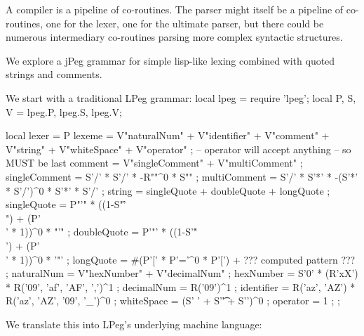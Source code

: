 A compiler is a pipeline of co-routines. The parser might itself be a 
pipeline of co-routines, one for the lexer, one for the ultimate parser, 
but there could be numerous intermediary co-routines parsing more complex 
syntactic structures. 

We explore a jPeg grammar for simple lisp-like lexing combined with quoted 
strings and comments. 

We start with a traditional LPeg grammar:
\starttyping
local lpeg = require 'lpeg';
local P, S, V = lpeg.P, lpeg.S, lpeg.V;

local lexer = P {
  lexeme     = V"naturalNum" +
               V"identifier" +
               V"comment"    +
               V"string"     +
               V"whiteSpace" +
               V"operator"   ; -- operator will accept anything
                               -- so MUST be last
  comment       = V"singleComment" + V"multiComment" ;
  singleComment = S'/' * S'/' * -R"\n"^0 * S"\n" ; 
  multiComment  = S'/' * S'*' * -(S'*' * S'/')^0 * S'*' * S'/' ;
  string      = singleQuote + doubleQuote + longQuote ;
  singleQuote = P"'" * ((1-S"'\r\n\f\\") + (P'\\' * 1))^0 * "'" ;
  doubleQuote = P'"' * ((1-S'"\r\n\f\\') + (P'\\' * 1))^0 * '"' ;
  longQuote   = #(P'[' * P'='^0 * P'[') +  ??? computed pattern ??? ;
  naturalNum = V"hexNumber" + V"decimalNum" ;
  hexNumber  = S'0' * (R'xX') * R('09', 'af', 'AF', ',')^1 ;
  decimalNum = R('09')^1 ;
  identifier = R('az', 'AZ') * R('az', 'AZ', '09', '_')^0 ;
  whiteSpace = (S' ' + S'\t' + S'\n')^0 ;
  operator   = 1 ;
};
\stoptyping

We translate this into LPeg's underlying machine language:

